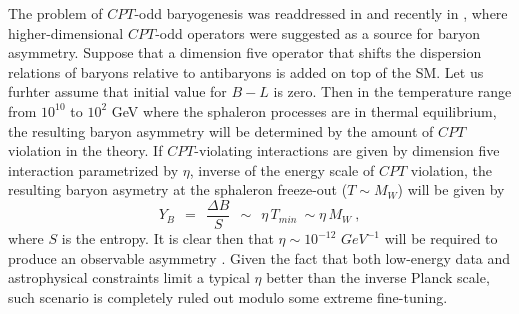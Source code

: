 \documentclass[12pt]{revtex4}
\begin{document}
    

    
	
	
	
	
	The problem of $CPT$-odd baryogenesis was readdressed in \cite{Bertolami:1996cq}
and recently in \cite{Carroll:2005dj}, where higher-dimensional $CPT$-odd operators 
were suggested as a source for baryon asymmetry. Suppose that a dimension five operator that 
shifts the dispersion relations of baryons relative to antibaryons is added on top of the SM. 
Let us furhter assume that initial value for $B-L$ is zero.
Then in the temperature range from $10^{10}$ to $10^2$ GeV where the sphaleron processes are in thermal 
equilibrium, the resulting baryon asymmetry will be determined by the amount of $CPT$ violation in the 
theory. If $CPT$-violating interactions are given by dimension five interaction parametrized by $\eta$, inverse of
the energy scale of $CPT$ violation, the resulting baryon 
asymetry at the sphaleron freeze-out ($T\sim M_W$) will be given by 
\begin{equation}
\label{baryo}
	Y_B ~~=~~ \frac{\Delta B}{S} ~~\sim~~ \eta\, T_{min}~ \sim \eta\, M_W~,
\end{equation}
	where $ S $ is the entropy. It is clear then that $\eta \sim 10^{-12}$ $GeV^{-1}$ will 
	be required to produce an observable asymmetry \cite{Carroll:2005dj}. 
Given the fact that both low-energy data and 
	astrophysical constraints limit a typical $\eta$ better than the inverse Planck scale,
	such scenario is completely ruled out modulo some extreme fine-tuning. 


\end{document}
